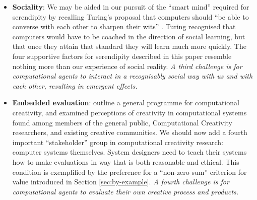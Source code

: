 \begin{itemize}
\item \textbf{Sociality}: We may be aided in our pursuit of the
  ``smart mind'' required for serendipity by recalling Turing's
  proposal that computers should ``be able to converse with each other
  to sharpen their wits'' \cite{turing-intelligent}.  Turing
  recognised that computers would have to be coached in the direction
  of social learning, but that once they attain that standard they
  will learn much more quickly.  The four supportive factors for
  serendipity described in this paper resemble nothing more than our
  experience of social reality.  \emph{A third challenge is for
    computational agents to interact in a recognisably social way with
    us and with each other, resulting in emergent effects.}
\end{itemize}

\begin{itemize}
\item \textbf{Embedded evaluation}:
   outline a general programme
  for computational creativity, and examined perceptions of creativity
  in computational systems found among members of the general public,
  Computational Creativity researchers, and existing creative
  communities.  We should now add a fourth important ``stakeholder''
  group in computational creativity research: computer systems
  themselves.  System designers need to teach their systems how to
  make evaluations in way that is both reasonable and ethical.  This
  condition is exemplified by the preference for a ``non-zero sum''
  criterion for value introduced in Section \ref{sec:by-example}.
  \emph{A fourth challenge is for computational agents to evaluate
    their own creative process and products.}
\end{itemize}



